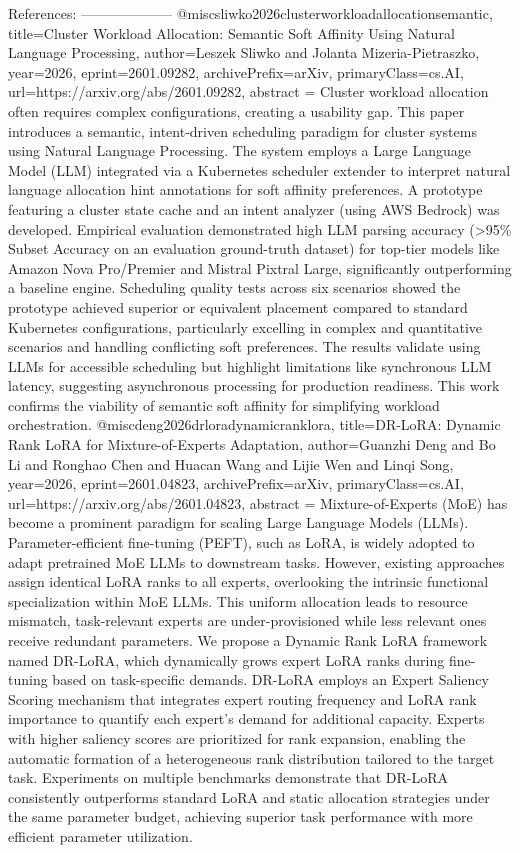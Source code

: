         References:
        --------------------
        @misc{sliwko2026clusterworkloadallocationsemantic,
      title={Cluster Workload Allocation: Semantic Soft Affinity Using Natural Language Processing}, 
      author={Leszek Sliwko and Jolanta Mizeria-Pietraszko},
      year={2026},
      eprint={2601.09282},
      archivePrefix={arXiv},
      primaryClass={cs.AI},
      url={https://arxiv.org/abs/2601.09282},
      abstract = {Cluster workload allocation often requires complex configurations, creating a usability gap. This paper introduces a semantic, intent-driven scheduling paradigm for cluster systems using Natural Language Processing. The system employs a Large Language Model (LLM) integrated via a Kubernetes scheduler extender to interpret natural language allocation hint annotations for soft affinity preferences. A prototype featuring a cluster state cache and an intent analyzer (using AWS Bedrock) was developed. Empirical evaluation demonstrated high LLM parsing accuracy (>95\% Subset Accuracy on an evaluation ground-truth dataset) for top-tier models like Amazon Nova Pro/Premier and Mistral Pixtral Large, significantly outperforming a baseline engine. Scheduling quality tests across six scenarios showed the prototype achieved superior or equivalent placement compared to standard Kubernetes configurations, particularly excelling in complex and quantitative scenarios and handling conflicting soft preferences. The results validate using LLMs for accessible scheduling but highlight limitations like synchronous LLM latency, suggesting asynchronous processing for production readiness. This work confirms the viability of semantic soft affinity for simplifying workload orchestration.}
}@misc{deng2026drloradynamicranklora,
      title={DR-LoRA: Dynamic Rank LoRA for Mixture-of-Experts Adaptation}, 
      author={Guanzhi Deng and Bo Li and Ronghao Chen and Huacan Wang and Lijie Wen and Linqi Song},
      year={2026},
      eprint={2601.04823},
      archivePrefix={arXiv},
      primaryClass={cs.AI},
      url={https://arxiv.org/abs/2601.04823},
      abstract = {Mixture-of-Experts (MoE) has become a prominent paradigm for scaling Large Language Models (LLMs). Parameter-efficient fine-tuning (PEFT), such as LoRA, is widely adopted to adapt pretrained MoE LLMs to downstream tasks. However, existing approaches assign identical LoRA ranks to all experts, overlooking the intrinsic functional specialization within MoE LLMs. This uniform allocation leads to resource mismatch, task-relevant experts are under-provisioned while less relevant ones receive redundant parameters. We propose a Dynamic Rank LoRA framework named DR-LoRA, which dynamically grows expert LoRA ranks during fine-tuning based on task-specific demands. DR-LoRA employs an Expert Saliency Scoring mechanism that integrates expert routing frequency and LoRA rank importance to quantify each expert's demand for additional capacity. Experts with higher saliency scores are prioritized for rank expansion, enabling the automatic formation of a heterogeneous rank distribution tailored to the target task. Experiments on multiple benchmarks demonstrate that DR-LoRA consistently outperforms standard LoRA and static allocation strategies under the same parameter budget, achieving superior task performance with more efficient parameter utilization.}
}
